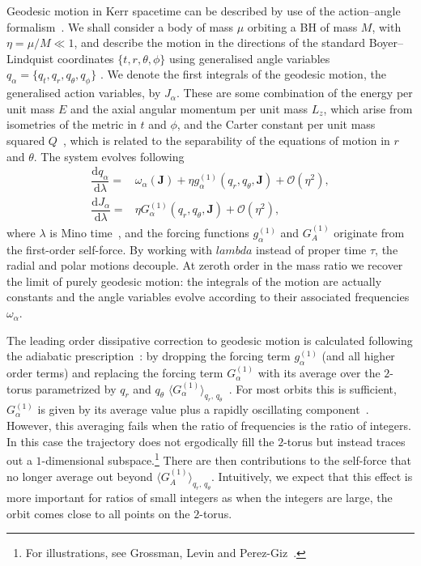 \documentclass[aps,prd,amsfonts,amssymb,amsmath,nofootinbib,reprint,showpacs]{revtex4}
\newcommand{\dd}{\ensuremath{\mathrm{d}}}
\newcommand{\diff}[2]{\ensuremath{\dfrac{\dd {#1}}{\dd {#2}}}}
\newcommand{\order}[1]{\ensuremath{\mathcal{O}({#1})}}
\begin{document}
Geodesic motion in Kerr spacetime can be described by use of the action--angle formalism~\cite{Goldstein2002}. %
We shall consider a body of mass $\mu$ orbiting a BH of mass $M$, with $\eta = \mu/M \ll 1$, and describe the motion in the directions of the standard Boyer--Lindquist coordinates $\{t,r,\theta,\phi\}$ using generalised angle variables $q_\alpha = \{q_t,q_r,q_\theta,q_\phi\}$ \citep{Hinderer2008}. We denote the first integrals of the geodesic motion, the generalised action variables, by $J_\alpha$. These are some combination of the energy per unit mass $E$ and the axial angular momentum per unit mass $L_z$, which arise from isometries of the metric in $t$ and $\phi$, and the Carter constant per unit mass squared $Q$~\cite{Carter1968}, which is related to the separability of the equations of motion in $r$ and $\theta$. The system evolves following~\cite{Flanagan2012}
\begin{subequations}
\label{eq:Mino-E-o-M}
\begin{align}
\diff{q_\alpha}{\lambda} = {} & \omega_\alpha(\boldsymbol{J}) + \eta g_\alpha^{(1)}(q_r,q_\theta,\boldsymbol{J}) + \order{\eta^2}, \\
\diff{J_\alpha}{\lambda} = {} & \eta G_\alpha^{(1)}(q_r,q_\theta,\boldsymbol{J}) + \order{\eta^2},
\end{align}
\end{subequations}
where $\lambda$ is Mino time~\cite{Mino2003}, and the forcing functions $g_\alpha^{(1)}$ and $G_A^{(1)}$ originate from the first-order self-force. By working with $lambda$ instead of proper time $\tau$, the radial and polar motions decouple. At zeroth order in the mass ratio we recover the limit of purely geodesic motion: the integrals of the motion are actually constants and the angle variables evolve according to their associated frequencies $\omega_\alpha$.

The leading order dissipative correction to geodesic motion is calculated following the adiabatic prescription~\cite{Hinderer2008}: by dropping the forcing term $g_\alpha^{(1)}$ (and all higher order terms) and replacing the forcing term $G_\alpha^{(1)}$ with its average over the $2$-torus parametrized by $q_r$ and $q_\theta$ $\langle G_\alpha^{(1)}\rangle_{q_r,\,q_\theta}$~\cite{Drasco2005}. For most orbits this is sufficient, $G_\alpha^{(1)}$ is given by its average value plus a rapidly oscillating component~\cite{Arnold1988}. %
However, this averaging fails when the ratio of frequencies is the ratio of integers. In this case the trajectory does not ergodically fill the $2$-torus but instead traces out a $1$-dimensional subspace.\footnote{For illustrations, see Grossman, Levin and Perez-Giz~\cite{Grossman2012}.} There are then contributions to the self-force that no longer average out beyond $\langle G_A^{(1)}\rangle_{q_r,\,q_\theta}$. Intuitively, we expect that this effect is more important for ratios of small integers as when the integers are large, the orbit comes close to all points on the $2$-torus.
\end{document}
